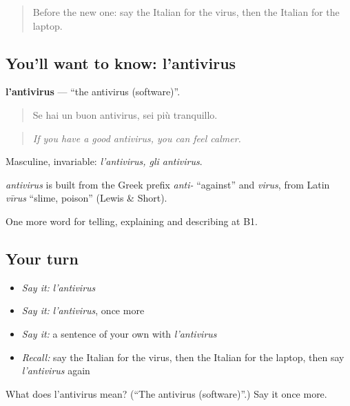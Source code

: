 \label{lesson:IT-C404-antivirus}



\begin{quote}
Before the new one: say the Italian for the virus, then the Italian for the laptop.
\end{quote}

\subsection*{You'll want to know: l'antivirus}
\textbf{l'antivirus} — \textquotedblleft{}the antivirus (software)\textquotedblright{}.

\begin{quote}
Se hai un buon antivirus, sei più tranquillo.
\end{quote}

\begin{quote}
\emph{If you have a good antivirus, you can feel calmer.}
\end{quote}

Masculine, invariable: \emph{l'antivirus, gli antivirus}.

\begin{cousinweb}
\emph{antivirus} is built from the Greek prefix \emph{anti-} \textquotedblleft{}against\textquotedblright{} and \emph{virus}, from Latin \emph{vīrus} \textquotedblleft{}slime, poison\textquotedblright{} (Lewis \& Short).
\end{cousinweb}

\begin{grammarlens}[title={What you've built}]
One more word for telling, explaining and describing at B1.
\end{grammarlens}

\subsection*{Your turn}
\begin{itemize}
\raggedright
  \item \emph{Say it:} \emph{l'antivirus}
  \item \emph{Say it:} \emph{l'antivirus}, once more
  \item \emph{Say it:} a sentence of your own with \emph{l'antivirus}
  \item \emph{Recall:} say the Italian for the virus, then the Italian for the laptop, then say \emph{l'antivirus} again
\end{itemize}

\begin{tcolorbox}[breakable,colback=teal!4,colframe=teal!35!black,title={Before you move on}]
What does l'antivirus mean? (\textquotedblleft{}The antivirus (software)\textquotedblright{}.) Say it once more.
\end{tcolorbox}
